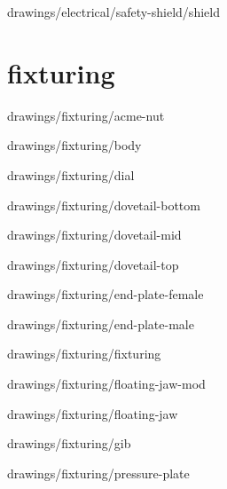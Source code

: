 
{drawings/electrical/safety-shield/shield}

\section{fixturing}


{drawings/fixturing/acme-nut}


{drawings/fixturing/body}


{drawings/fixturing/dial}


{drawings/fixturing/dovetail-bottom}


{drawings/fixturing/dovetail-mid}


{drawings/fixturing/dovetail-top}


{drawings/fixturing/end-plate-female}


{drawings/fixturing/end-plate-male}


{drawings/fixturing/fixturing}


{drawings/fixturing/floating-jaw-mod}


{drawings/fixturing/floating-jaw}


{drawings/fixturing/gib}


{drawings/fixturing/pressure-plate}

